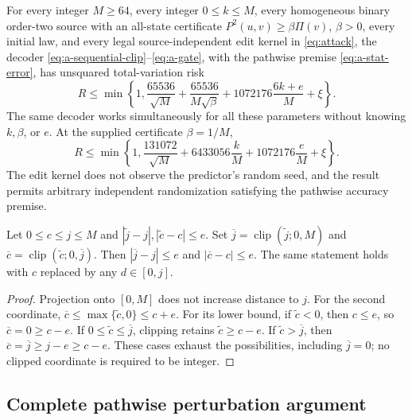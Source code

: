 \begin{theorem}
\label{thm:approximate-gate}
For every integer $M\ge64$, every integer $0\le k\le M$, every homogeneous
binary order-two source with an all-state certificate
$P^2(u,v)\ge\beta\Pi(v)$, $\beta>0$, every initial law, and every legal
source-independent edit kernel in \eqref{eq:attack}, the decoder
\eqref{eq:a-sequential-clip}--\eqref{eq:a-gate}, with the pathwise premise
\eqref{eq:a-stat-error}, has unsquared total-variation risk
\begin{equation}\label{eq:a-risk-general}
 R\le\min\left\{1,
 \frac{65536}{\sqrt M}+\frac{65536}{M\sqrt\beta}
 +1072176\frac{6k+e}{M}+\xi\right\}.
\end{equation}
The same decoder works simultaneously for all these parameters without
knowing $k,\beta$, or $e$.  At the supplied certificate $\beta=1/M$,
\begin{equation}\label{eq:a-risk-critical}
 R\le\min\left\{1,
 \frac{131072}{\sqrt M}+6433056\frac{k}{M}
 +1072176\frac eM+\xi\right\}.
\end{equation}
The edit kernel does not observe the predictor's random seed, and the
result permits arbitrary independent randomization satisfying the
pathwise accuracy premise.
\end{theorem}

\begin{lemma}
\label{lem:a-clipping}
Let $0\le c\le j\le M$ and
$|\widetilde j-j|,|\widetilde c-c|\le e$.
Set $\overline j=\operatorname{clip}(\widetilde j;0,M)$ and
$\overline c=\operatorname{clip}(\widetilde c;0,\overline j)$.
Then $|\overline j-j|\le e$ and $|\overline c-c|\le e$.
The same statement holds with $c$ replaced by any $d\in[0,j]$.
\end{lemma}
\begin{proof}
Projection onto $[0,M]$ does not increase distance to $j$.
For the second coordinate,
$\overline c\le\max\{\widetilde c,0\}\le c+e$.
For its lower bound, if $\widetilde c<0$, then $c\le e$, so
$\overline c=0\ge c-e$.  If
$0\le\widetilde c\le\overline j$, clipping retains
$\widetilde c\ge c-e$.  If $\widetilde c>\overline j$, then
$\overline c=\overline j\ge j-e\ge c-e$.
These cases exhaust the possibilities, including $\overline j=0$;
no clipped coordinate is required to be integer.
\end{proof}

\subsection{Complete pathwise perturbation argument}

